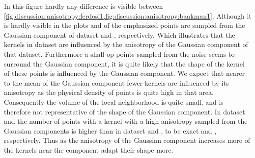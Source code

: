 				In this figure hardly any difference is visible between \cref{fig:discussion:anisotropy:ferdosi1,fig:discussion:anisotropy:baakman1}. 
					Although it is hardly visible in the plots  and  of the emphasized points are sampled from the Gaussian component of dataset \ferdosiOne and \baakmanOne, respectively. Which illustrates that the kernels in dataset \baakmanOne are influenced by the anisotropy of the Gaussian component of that dataset.
					Furthermore a shall op points sampled from the noise seems to surround the Gaussian component, it is quite likely that the shape of the kernel of these points is influenced by the Gaussian component. 
					We expect that nearer to the mean of the Gaussian component fewer kernels are influenced by its anisotropy as the physical density of points is quite high in that area. Consequently the volume of the local neighborhood is quite small, and is therefore not representative of the shape of the Gaussian component. 
				In dataset \baakmanFour and \baakmanFive the number of points with a kernel with a high anisotropy sampled from the Gaussian components is higher than in dataset \ferdosiOne and \baakmanOne, to be exact  and , respectively. Thus as the anisotropy of the Gaussian component increases more of the kernels near the component adapt their shape more. 
		
